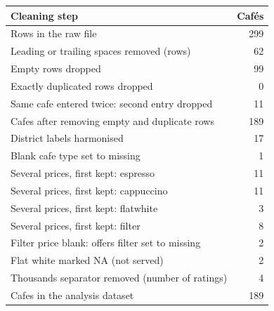 \begin{tabular}{lr}
\toprule
Cleaning step & Caf\'es \\
\midrule
Rows in the raw file & 299 \\
Leading or trailing spaces removed (rows) & 62 \\
Empty rows dropped & 99 \\
Exactly duplicated rows dropped & 0 \\
Same cafe entered twice: second entry dropped & 11 \\
Cafes after removing empty and duplicate rows & 189 \\
District labels harmonised & 17 \\
Blank cafe type set to missing & 1 \\
Several prices, first kept: espresso & 11 \\
Several prices, first kept: cappuccino & 11 \\
Several prices, first kept: flatwhite & 3 \\
Several prices, first kept: filter & 8 \\
Filter price blank: offers filter set to missing & 2 \\
Flat white marked NA (not served) & 2 \\
Thousands separator removed (number of ratings) & 4 \\
Cafes in the analysis dataset & 189 \\
\bottomrule
\end{tabular}
